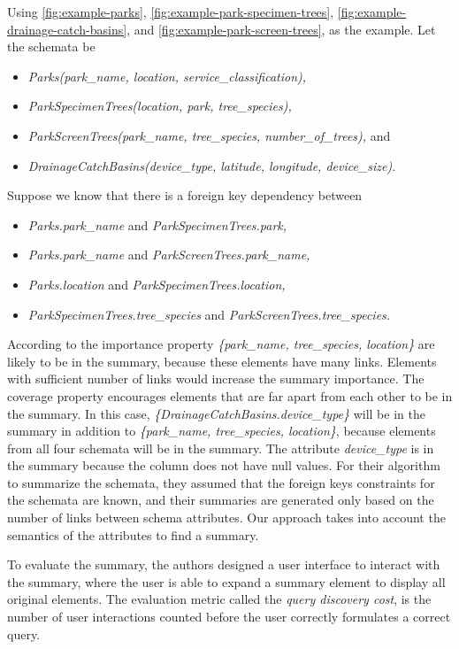 Using \autoref{fig:example-parks}, \autoref{fig:example-park-specimen-trees}, \autoref{fig:example-drainage-catch-basins}, and \autoref{fig:example-park-screen-trees}, as the example. Let the schemata be
\begin{itemize}
	\item[] \textit{Parks(park\_name, location, service\_classification),}
	\item[] \textit{ParkSpecimenTrees(location, park, tree\_species),}
	\item[] \textit{ParkScreenTrees(park\_name, tree\_species, number\_of\_trees),} and 
	\item[] \textit{DrainageCatchBasins(device\_type, latitude, longitude, device\_size)}.
\end{itemize}
Suppose we know that there is a foreign key dependency between
\begin{itemize}
	\item[] \textit{Parks.park\_name} and \textit{ParkSpecimenTrees.park,}
	\item[] \textit{Parks.park\_name} and \textit{ParkScreenTrees.park\_name,}
	\item[] \textit{Parks.location} and \textit{ParkSpecimenTrees.location,}
	\item[] \textit{ParkSpecimenTrees.tree\_species} and \textit{ParkScreenTrees.tree\_species.}
\end{itemize}
According to the importance property \textit{\{park\_name, tree\_species, location\}} are likely to be in the summary, because these elements have many links. Elements with sufficient number of links would increase the summary importance. The coverage property encourages elements that are far apart from each other to be in the summary. In this case, \textit{\{DrainageCatchBasins.device\_type\}} will be in the summary in addition to \textit{\{park\_name, tree\_species, location\}}, because elements from all four schemata will be in the summary. The attribute \textit{device\_type} is in the summary because the column does not have null values. For their algorithm to summarize the schemata, they assumed that the foreign keys constraints for the schemata are known, and their summaries are generated only based on the number of links between schema attributes. Our approach takes into account the semantics of the attributes to find a summary.

To evaluate the summary, the authors designed a user interface to interact with the summary, where the user is able to expand a summary element to display all original elements. The evaluation metric called the \textit{query discovery cost}, is the number of user interactions counted before the user correctly formulates a correct query.

